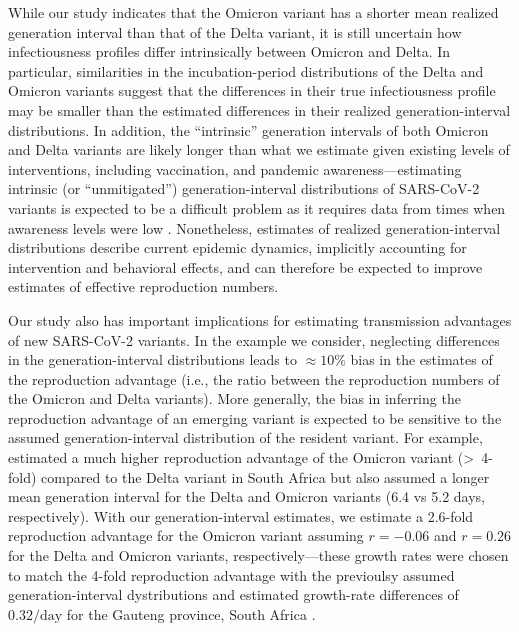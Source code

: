 \documentclass[12pt]{article}
\begin{document}
While our study indicates that the Omicron variant has a shorter mean realized generation interval than that of the Delta variant, it is still uncertain how infectiousness profiles differ intrinsically between Omicron and Delta.
In particular, similarities in the incubation-period distributions of the Delta and Omicron variants suggest that the differences in their true infectiousness profile may be smaller than the estimated differences in their realized generation-interval distributions.
In addition, the ``intrinsic'' generation intervals of both Omicron and Delta variants are likely longer than what we estimate given existing levels of interventions, including vaccination, and pandemic awareness---estimating intrinsic (or ``unmitigated'') generation-interval distributions of SARS-CoV-2 variants is expected to be a difficult problem as it requires data from times when awareness levels were low \citep{sender2021unmitigated}.
Nonetheless, estimates of realized generation-interval distributions describe current epidemic dynamics, implicitly accounting for intervention and behavioral effects,
and can therefore be expected to improve estimates of effective reproduction numbers.

Our study also has important implications for estimating transmission advantages of new SARS-CoV-2 variants.
In the example we consider, neglecting differences in the generation-interval distributions leads to $\approx 10\%$ bias in the estimates of the reproduction advantage (i.e., the ratio between the reproduction numbers of the Omicron and Delta variants).
More generally, the bias in inferring the reproduction advantage of an emerging variant is expected to be sensitive to the assumed generation-interval distribution of the resident variant.
For example, \cite{pearson2021bounding} estimated a much higher reproduction advantage of the Omicron variant (\textgreater\ 4-fold) compared to the Delta variant in South Africa but also assumed a longer mean generation interval for the Delta and Omicron variants (6.4 vs 5.2 days, respectively).
With our generation-interval estimates, we estimate a 2.6-fold reproduction advantage for the Omicron variant assuming $r=-0.06$ and $r=0.26$ for the Delta and Omicron variants, respectively---these growth rates were chosen to match the 4-fold reproduction advantage with the previoulsy assumed generation-interval dystributions and estimated growth-rate differences of $0.32/\mathrm{day}$ for the Gauteng province, South Africa \cite{pearson2021bounding}.
\end{document}
